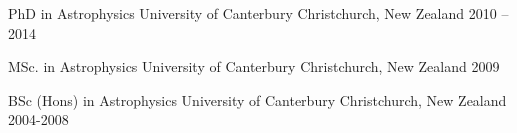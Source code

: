 

\begin{cventries}

  \cventry
    {PhD in Astrophysics} %
    {University of Canterbury} %
    {Christchurch, New Zealand} %
    {2010 -- 2014} %
    {
    }
    
  \cventry
    {MSc. in Astrophysics} %
    {University of Canterbury} %
    {Christchurch, New Zealand} %
    {2009} %
    {
    }
    
  \cventry
    {BSc (Hons) in Astrophysics} %
    {University of Canterbury} %
    {Christchurch, New Zealand} %
    {2004-2008} %
    {
    }

\end{cventries}
